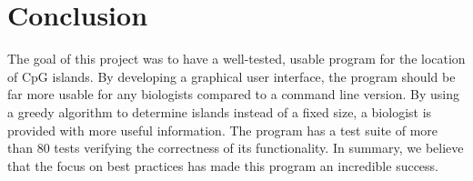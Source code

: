 \documentclass{bioinfo}
\begin{document}
\section{Conclusion}
The goal of this project was to have a well-tested, usable program for
the location of CpG islands. By developing a graphical user interface,
the program should be far more usable for any biologists compared to a
command line version. By using a greedy algorithm to determine islands
instead of a fixed size, a biologist is provided with more useful
information. The program has a test suite of more than 80 tests
verifying the correctness of its functionality. In summary, we believe
that the focus on best practices has made this program an incredible
success.

% 
% 

% 
% 
% 
% 
% 

\end{document}
